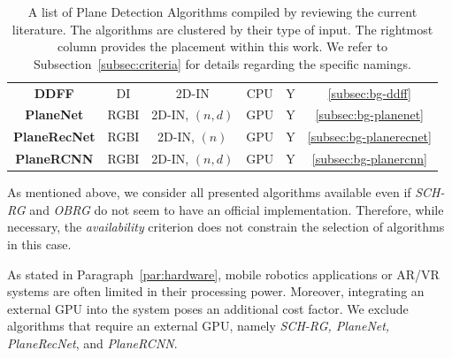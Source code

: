 \documentclass[main.tex]{subfiles}
\begin{document}
\begin{table}[H]
{\begin{tabular}{c|c|c|c|c|c}
            \textbf{DDFF} \cite{Roychoudhury_Missura_Bennewitz_2021}         & DI                  & 2D-IN                 & CPU               & Y                  & \ref{subsec:bg-ddff}        \\
            \textbf{PlaneNet} \cite{Liu_Yang_Ceylan_Yumer_Furukawa_2018}     & RGBI                & 2D-IN, $(n, d)$       & GPU               & Y                  & \ref{subsec:bg-planenet}    \\
            \textbf{PlaneRecNet} \cite{Xie_Shu_Rambach_Pagani_Stricker_2022} & RGBI                & 2D-IN, $(n)$            & GPU               & Y                  & \ref{subsec:bg-planerecnet} \\
            \textbf{PlaneRCNN} \cite{Liu_Kim_Gu_Furukawa_Kautz_2019}         & RGBI                & 2D-IN, $(n, d)$       & GPU               & Y                  & \ref{subsec:bg-planercnn}   \\
        \end{tabular}
    }
    \caption{A list of Plane Detection Algorithms compiled by reviewing the current literature. The algorithms are clustered by their type of input.
        The rightmost column provides the placement within this work. We refer to Subsection~\ref{subsec:criteria} for details regarding the specific namings.}
    \label{tab:algos}
\end{table}

As mentioned above, we consider all presented algorithms available even if \textit{SCH-RG} and \textit{OBRG} do not seem to have an official implementation.
Therefore, while necessary, the \textit{availability} criterion does not constrain the selection of algorithms in this case.

As stated in Paragraph~\ref{par:hardware}, mobile robotics applications or AR/VR systems are often limited in their processing power.
Moreover, integrating an external GPU into the system poses an additional cost factor.
We exclude algorithms that require an external GPU, namely \textit{SCH-RG, PlaneNet, PlaneRecNet}, and \textit{PlaneRCNN}.
\end{document}
